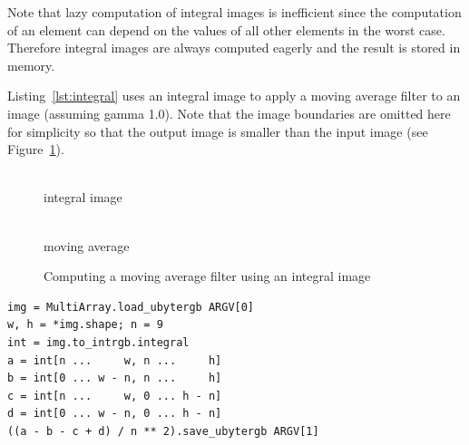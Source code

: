 \documentclass[12pt,a4paper,oneside,openright]{book}
\newcommand{\fig}[1]{Figure~\ref{fig:#1}}
\newcommand{\lst}[1]{Listing~\ref{lst:#1}}
\begin{document}
\begin{CJK}{UTF8}{}
Note that lazy computation of integral images is inefficient since the computation of an element can depend on the values of all other elements in the worst case. Therefore integral images are always computed eagerly and the result is stored in memory.

\lst{integral} uses an integral image to apply a moving average filter to an image (assuming gamma 1.0). Note that the image boundaries are omitted here for simplicity so that the output image is smaller than the input image (see \fig{integral}).
\begin{figure}[htbp]
  \begin{center}
    \begin{minipage}[t]{.45\textwidth}
      \begin{center}
        \\
        integral image
      \end{center}
    \end{minipage}
    \hspace{.5cm}
    \begin{minipage}[t]{.45\textwidth}
      \begin{center}
        \\
        moving average
      \end{center}
    \end{minipage}
    \caption{Computing a moving average filter using an integral image\label{fig:integral}}
  \end{center}
\end{figure}
\lstset{language=Ruby,frame=single,numbers=none}
\begin{lstlisting}[float,caption={Moving average filter implemented using an integral image},label=lst:integral]
img = MultiArray.load_ubytergb ARGV[0]
w, h = *img.shape; n = 9
int = img.to_intrgb.integral
a = int[n ...     w, n ...     h]
b = int[0 ... w - n, n ...     h]
c = int[n ...     w, 0 ... h - n]
d = int[0 ... w - n, 0 ... h - n]
((a - b - c + d) / n ** 2).save_ubytergb ARGV[1]
\end{lstlisting}


\end{CJK}
\end{document}

